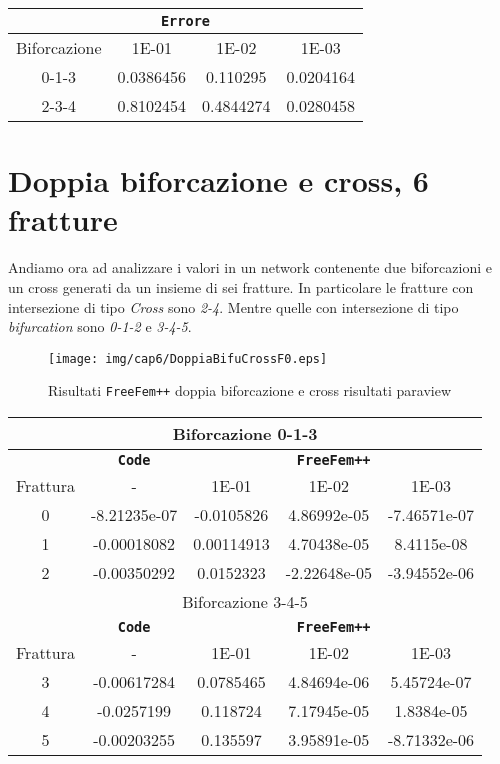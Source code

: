 \begin{center}
\begin{tabular}{|c|c|c|c|}
\hline
  \multicolumn{4}{|c|}{\textbf{\texttt{Errore}}} \\ 
\hline
\multicolumn{1}{|c|}{Biforcazione} &
\multicolumn{1}{|c|}{1E-01} & 1E-02 & 1E-03 \\
\hline
  0-1-3 &  0.0386456 & 0.110295 & 0.0204164 \\
  2-3-4 & 0.8102454 & 0.4844274 & 0.0280458 \\
\hline
\end{tabular}
\end{center}


\section{Doppia biforcazione e cross, 6 fratture}
Andiamo ora ad analizzare i valori in un network contenente due biforcazioni e un cross generati da un insieme di sei fratture. In particolare le fratture con intersezione di tipo \textit{Cross} sono \textit{2-4}. Mentre quelle con intersezione di tipo \textit{bifurcation} sono \textit{0-1-2} e \textit{3-4-5}.\\

\begin{figure}[h!]
\centering
\texttt{[image: img/cap6/DoppiaBifuCrossF0.eps]}
\caption{Risultati \texttt{FreeFem++} doppia biforcazione e cross risultati paraview }\label{DoppiaBifuCrossParaview}
\end{figure}

\begin{center}
\begin{tabular}{|c|c|c|c|c|}
\hline
\multicolumn{5}{|c|}{Biforcazione 0-1-3}\\
\hline
 & \textbf{\texttt{Code}} & \multicolumn{3}{|c|}{\textbf{\texttt{FreeFem++}}} \\
\hline
\multicolumn{1}{|c|}{Frattura} & - &
\multicolumn{1}{|c|}{1E-01} & 1E-02 & 1E-03 \\
\hline
 0 & -8.21235e-07 & -0.0105826 & 4.86992e-05 & -7.46571e-07\\
 1 & -0.00018082 & 0.00114913 & 4.70438e-05 & 8.4115e-08\\  
 2 & -0.00350292 & 0.0152323 & -2.22648e-05 & -3.94552e-06\\
\hline
\multicolumn{5}{|c|}{Biforcazione 3-4-5}\\
\hline
 & \textbf{\texttt{Code}} & \multicolumn{3}{|c|}{\textbf{\texttt{FreeFem++}}} \\
\hline
\multicolumn{1}{|c|}{Frattura} & - &
\multicolumn{1}{|c|}{1E-01} & 1E-02 & 1E-03 \\
\hline
 3 & -0.00617284 & 0.0785465 & 4.84694e-06 & 5.45724e-07\\ 
 4 & -0.0257199 & 0.118724 & 7.17945e-05 & 1.8384e-05\\
 5 & -0.00203255 & 0.135597 & 3.95891e-05 & -8.71332e-06\\
\hline
\end{tabular}
\end{center}

